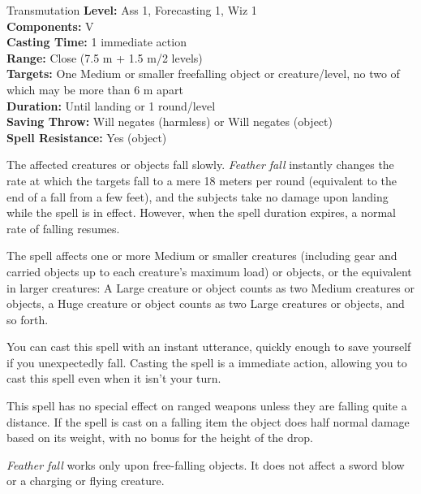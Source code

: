 {Transmutation}
{
	\textbf{Level:}
	Ass 1, Forecasting 1, Wiz 1\\
	\textbf{Components:}
	V\\
	\textbf{Casting Time:}
	1 immediate action\\
	\textbf{Range:}
	Close (7.5 m + 1.5 m/2 levels)\\
	\textbf{Targets:}
	One Medium or smaller freefalling object or creature/level, no two of which may be more than 6 m apart\\
	\textbf{Duration:}
	Until landing or 1 round/level\\
	\textbf{Saving Throw:}
	Will negates (harmless) or Will negates (object)\\
	\textbf{Spell Resistance:}
	Yes (object)\\
}
{
	The affected creatures or objects fall slowly. \emph{Feather fall} instantly changes the rate at which the targets fall to a mere 18 meters per round (equivalent to the end of a fall from a few feet), and the subjects take no damage upon landing while the spell is in effect. However, when the spell duration expires, a normal rate of falling resumes.

	The spell affects one or more Medium or smaller creatures (including gear and carried objects up to each creature's maximum load) or objects, or the equivalent in larger creatures: A Large creature or object counts as two Medium creatures or objects, a Huge creature or object counts as two Large creatures or objects, and so forth.

	You can cast this spell with an instant utterance, quickly enough to save yourself if you unexpectedly fall. Casting the spell is a immediate action, allowing you to cast this spell even when it isn't your turn.

	This spell has no special effect on ranged weapons unless they are falling quite a distance. If the spell is cast on a falling item the object does half normal damage based on its weight, with no bonus for the height of the drop.

	\emph{Feather fall} works only upon free-falling objects. It does not affect a sword blow or a charging or flying creature.

}
